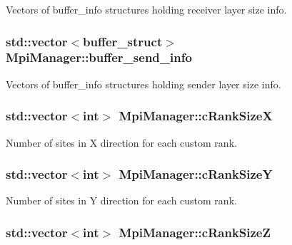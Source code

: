 Vectors of buffer\+\_\+info structures holding receiver layer size info. 

\subsubsection[{\texorpdfstring{buffer\+\_\+send\+\_\+info}{buffer_send_info}}]{\setlength{\rightskip}{0pt plus 5cm}std\+::vector$<${\bf buffer\+\_\+struct}$>$ Mpi\+Manager\+::buffer\+\_\+send\+\_\+info}\hypertarget{class_mpi_manager_a3a91c2e8cfb15027a0681c198f82d257}{}\label{class_mpi_manager_a3a91c2e8cfb15027a0681c198f82d257}


Vectors of buffer\+\_\+info structures holding sender layer size info. 

\subsubsection[{\texorpdfstring{c\+Rank\+SizeX}{cRankSizeX}}]{\setlength{\rightskip}{0pt plus 5cm}std\+::vector$<$int$>$ Mpi\+Manager\+::c\+Rank\+SizeX}\hypertarget{class_mpi_manager_a54ce152f90bd51ff99f71e1011983977}{}\label{class_mpi_manager_a54ce152f90bd51ff99f71e1011983977}


Number of sites in X direction for each custom rank. 

\subsubsection[{\texorpdfstring{c\+Rank\+SizeY}{cRankSizeY}}]{\setlength{\rightskip}{0pt plus 5cm}std\+::vector$<$int$>$ Mpi\+Manager\+::c\+Rank\+SizeY}\hypertarget{class_mpi_manager_a4d583991c966c8eb44a52cbbb6ae4662}{}\label{class_mpi_manager_a4d583991c966c8eb44a52cbbb6ae4662}


Number of sites in Y direction for each custom rank. 

\subsubsection[{\texorpdfstring{c\+Rank\+SizeZ}{cRankSizeZ}}]{\setlength{\rightskip}{0pt plus 5cm}std\+::vector$<$int$>$ Mpi\+Manager\+::c\+Rank\+SizeZ}\hypertarget{class_mpi_manager_a17c2968f4c799dcadfa7bb8788eabaa1}{}\label{class_mpi_manager_a17c2968f4c799dcadfa7bb8788eabaa1}


